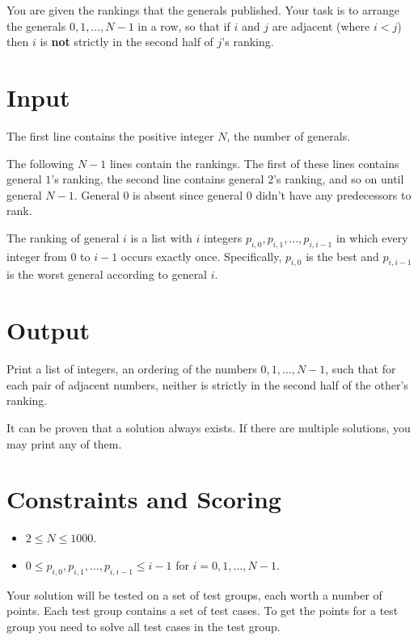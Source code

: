 You are given the rankings that the generals published. 
Your task is to arrange the generals $0,1,\ldots, N-1$ in a row, so that if $i$ and $j$ are adjacent 
(where $i < j$) then $i$ is \textbf{not} strictly in the second half of $j$'s ranking.


\section*{Input}

The first line contains the positive integer $N$, the number of generals.

The following $N-1$ lines contain the rankings. 
The first of these lines contains general $1$'s ranking, the second line contains general $2$'s ranking, 
and so on until general $N-1$. General $0$ is absent since general $0$ didn't have any predecessors to rank.

The ranking of general $i$ is a list with $i$ integers $p_{i,0}, p_{i,1}, \ldots, p_{i,i-1}$ 
in which every integer from $0$ to $i-1$ occurs exactly once.
Specifically, $p_{i,0}$ is the best and $p_{i,i-1}$ is the worst general according to general $i$.


\section*{Output}

Print a list of integers, an ordering of the numbers $0, 1, \ldots, N-1$, such that for each pair of adjacent numbers, 
neither is strictly in the second half of the other's ranking.

It can be proven that a solution always exists.
If there are multiple solutions, you may print any of them.

\section*{Constraints and Scoring}

\noindent
\begin{itemize}
  \item $2 \leq N \leq 1000$.
  \item $0 \leq p_{i,0}, p_{i,1}, \ldots, p_{i,i-1} \leq i-1$ for $i = 0, 1, \ldots, N-1$.
\end{itemize}


Your solution will be tested on a set of test groups, each worth a number of points. 
Each test group contains a set of test cases. To get the points for a test group you need to 
solve all test cases in the test group.

